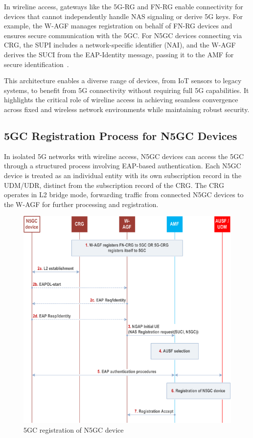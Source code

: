 In wireline access, gateways like the \ac{5G-RG} and \ac{FN-RG} enable connectivity for devices that cannot independently handle \ac{NAS} signaling or derive \ac{5G} keys. For example, the \ac{W-AGF} manages registration on behalf of \ac{FN-RG} devices and ensures secure communication with the \ac{5GC}. For \ac{N5GC} devices connecting via \ac{CRG}, the \ac{SUPI} includes a network-specific identifier (\ac{NAI}), and the \ac{W-AGF} derives the \ac{SUCI} from the \ac{EAP}-Identity message, passing it to the \ac{AMF} for secure identification~\cite{23.316-p23}.

This architecture enables a diverse range of devices, from \ac{IoT} sensors to legacy systems, to benefit from \ac{5G} connectivity without requiring full \ac{5G} capabilities. It highlights the critical role of wireline access in achieving seamless convergence across fixed and wireless network environments while maintaining robust security.

\subsection{\acs{5GC} Registration Process for \acs{N5GC} Devices}

In isolated \ac{5G} networks with wireline access, \ac{N5GC} devices can access the \ac{5GC} through a structured process involving \ac{EAP}-based authentication. Each \ac{N5GC} device is treated as an individual entity with its own subscription record in the \ac{UDM}/\ac{UDR}, distinct from the subscription record of the \ac{CRG}. The \ac{CRG} operates in L2 bridge mode, forwarding traffic from connected \ac{N5GC} devices to the \ac{W-AGF} for further processing and registration.

\begin{figure}
    \centering
    \includegraphics[width=0.75\linewidth]{figs/5GC registration of Non-5GC device.png}
    \caption{\acs{5GC} registration of \acs{N5GC} device}
    \label{fig:5GC registration of Non-5GC device}
\end{figure}

